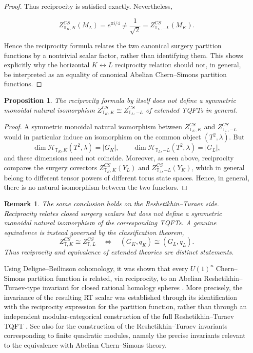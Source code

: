\documentclass[12pt]{amsart}
\numberwithin{equation}{section}
\newtheorem{prop}[theorem]{Proposition}
\newtheorem*{remark}{Remark}
\theoremstyle{definition}
\begin{document}
\begin{proof}
Thus reciprocity is satisfied exactly. Nevertheless,

$$
Z^{CS}_{\mathbb T_K,K}(M_L)
=
e^{\pi i/4}
\neq
\frac1{\sqrt2}
=
Z^{CS}_{\mathbb T_L,-L}(M_K).
$$

Hence the reciprocity formula relates the two canonical surgery partition functions by a nontrivial scalar factor, rather than identifying them. This shows explicitly why the horizontal $K\leftrightarrow L$ reciprocity relation should not, in general, be interpreted as an equality of canonical Abelian Chern--Simons partition functions.
\end{proof}

\begin{prop}
\label{prop:not-functorial-equivalence}
The reciprocity formula by itself does not define a symmetric monoidal natural isomorphism $Z^{CS}_{\mathbb T_K,K}\cong Z^{CS}_{\mathbb T_L,-L}$ of extended TQFTs in general.
\end{prop}


\begin{proof}
A symmetric monoidal natural isomorphism between
$Z^{CS}_{\mathbb T_K,K}$ and $Z^{CS}_{\mathbb T_L,-L}$ would in particular induce an
isomorphism on the common object $(T^2,\lambda)$. But
$$
\dim \mathcal H_{\mathbb T_K,K}(T^2,\lambda)=|G_K|,
\qquad
\dim \mathcal H_{\mathbb T_L,-L}(T^2,\lambda)=|G_L|,
$$
and these dimensions need not coincide. Moreover, as seen above, reciprocity compares the surgery covectors $Z^{CS}_{\mathbb T_K,K}(Y_L)$ and $Z^{CS}_{\mathbb T_L,-L}(Y_K)$, which in general belong to different tensor powers of different torus state spaces. Hence, in general, there is no natural isomorphism between the two functors.
\end{proof}

\begin{remark}
The same conclusion holds on the Reshetikhin--Turaev side. Reciprocity relates closed surgery scalars but does not define a symmetric monoidal natural isomorphism of the corresponding TQFTs. A genuine equivalence is instead governed by the classification theorem, 
$$ Z^{CS}_{\mathbb T,K}\cong Z^{CS}_{\mathbb T,L} \quad\Longleftrightarrow\quad (G_K,q_K)\cong(G_L,q_L). $$
Thus reciprocity and equivalence of extended theories are distinct statements.
\end{remark}
Using Deligne--Beilinson cohomology, it was shown that every  $U(1)^n$ Chern--Simons partition function is related, via reciprocity, to an Abelian Reshetikhin--Turaev-type invariant for closed rational homology spheres \cite{Tagaris2025}. More precisely, the invariance of the resulting RT scalar was established through its identification with the reciprocity expression for the partition function, rather than through an independent modular-categorical construction of the full Reshetikhin--Turaev TQFT \cite{Reshetikhin:1991}. See also \cite{Galviz3} for the construction of the Reshetikhin--Turaev invariants corresponding to finite quadratic modules, namely the precise invariants relevant to the equivalence with Abelian Chern--Simons theory.
\end{document}
